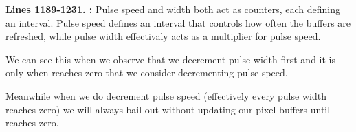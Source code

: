 \textbf{Lines 1189-1231. :} 
Pulse speed and width both act as counters, each defining an interval. Pulse speed
defines an interval that controls how often the buffers are refreshed, while 
pulse width effectivaly acts as a multiplier for pulse speed.

We can see this when we observe that we decrement pulse width first and it is only
when  reaches zero that we consider decrementing pulse speed.

Meanwhile when we do decrement pulse speed (effectively every pulse width reaches zero)
we will always bail out without updating our pixel buffers until 
reaches zero.

\clearpage

